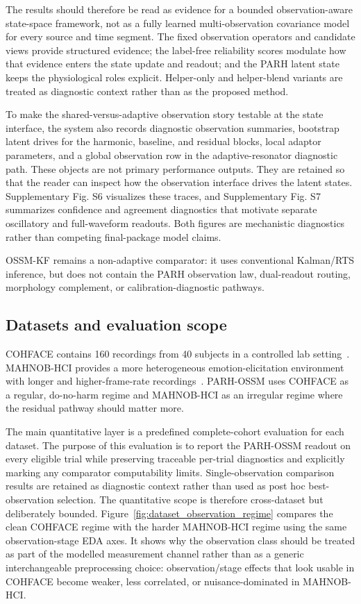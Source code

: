 \documentclass[fleqn,10pt]{wlscirep}
\begin{document}
The results should therefore be read as evidence for a bounded
observation-aware state-space framework, not as a fully learned
multi-observation covariance model for every source and time segment. The
fixed observation operators and candidate views provide structured evidence;
the label-free reliability scores modulate how that evidence enters the
state update and readout; and the PARH latent state keeps the physiological
roles explicit. Helper-only and helper-blend variants are treated as
diagnostic context rather than as the proposed method.

To make the shared-versus-adaptive observation story testable at the state
interface, the system also records diagnostic observation summaries,
bootstrap latent drives for the harmonic, baseline, and residual blocks,
local adaptor parameters, and a global observation row in the
adaptive-resonator diagnostic path. These objects are not primary performance
outputs. They are retained so that the reader can inspect how the observation
interface drives the latent states. Supplementary Fig. S6 visualizes these
traces, and Supplementary Fig. S7 summarizes confidence and agreement
diagnostics that motivate separate oscillatory and full-waveform readouts. Both
figures are mechanistic diagnostics rather than competing final-package model
claims.

OSSM-KF remains a non-adaptive comparator: it uses conventional Kalman/RTS
inference, but does not contain the PARH observation law, dual-readout routing,
morphology complement, or calibration-diagnostic pathways.

\subsection*{Datasets and evaluation scope}
COHFACE contains 160 recordings from 40 subjects in a controlled
lab setting~\cite{COHFACE2017}. MAHNOB-HCI provides a more heterogeneous
emotion-elicitation environment with longer and higher-frame-rate
recordings~\cite{MAHNOB2012}. PARH-OSSM uses COHFACE
as a regular, do-no-harm regime and MAHNOB-HCI as an irregular regime where
the residual pathway should matter more.

The main quantitative layer is a predefined complete-cohort evaluation for each
dataset. The purpose of this evaluation is to report the
PARH-OSSM readout on every eligible trial while preserving traceable per-trial
diagnostics and explicitly marking any comparator computability limits.
Single-observation comparison results are retained as diagnostic context rather than used as
post hoc best-observation selection. The quantitative scope is therefore
cross-dataset but deliberately bounded.
Figure~\ref{fig:dataset_observation_regime} compares the clean COHFACE
regime with the harder MAHNOB-HCI regime using the same observation-stage EDA
axes. It shows why the observation class should be treated as part of the
modelled measurement channel rather than as a generic interchangeable
preprocessing choice: observation/stage effects that look usable in COHFACE become
weaker, less correlated, or nuisance-dominated in MAHNOB-HCI.
\end{document}
